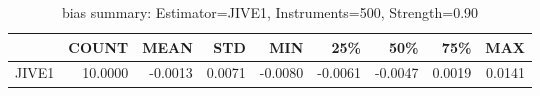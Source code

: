 \begin{table}[ht]
\centering
\caption{bias summary: Estimator=JIVE1, Instruments=500, Strength=0.90}
\begin{tabular}{lrrrrrrrr}
\toprule
 & COUNT & MEAN & STD & MIN & 25\% & 50\% & 75\% & MAX \\
\midrule
JIVE1 & 10.0000 & -0.0013 & 0.0071 & -0.0080 & -0.0061 & -0.0047 & 0.0019 & 0.0141 \\
\bottomrule
\end{tabular}
\end{table}

